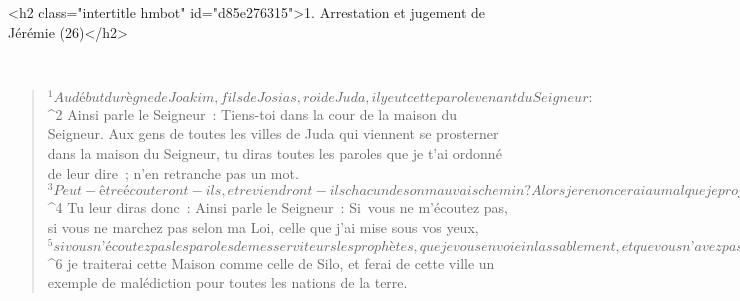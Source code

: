   
  
      <h2 class="intertitle hmbot" id="d85e276315">1. Arrestation et jugement de Jérémie (26)</h2>
      
         
      \bchapter{}
      \begin{verse}
${}^{1}Au début du règne de Joakim, fils de Josias, roi de Juda, il y eut cette parole venant du Seigneur : 
${}^{2} Ainsi parle le Seigneur : Tiens-toi dans la cour de la maison du Seigneur. Aux gens de toutes les villes de Juda qui viennent se prosterner dans la maison du Seigneur, tu diras toutes les paroles que je t’ai ordonné de leur dire ; n’en retranche pas un mot. 
${}^{3} Peut-être écouteront-ils, et reviendront-ils chacun de son mauvais chemin ? Alors je renoncerai au mal que je projette de leur faire à cause de la malice de leurs actes. 
${}^{4} Tu leur diras donc : Ainsi parle le Seigneur : Si vous ne m’écoutez pas, si vous ne marchez pas selon ma Loi, celle que j’ai mise sous vos yeux, 
${}^{5} si vous n’écoutez pas les paroles de mes serviteurs les prophètes, que je vous envoie inlassablement, et que vous n’avez pas écoutés, 
${}^{6} je traiterai cette Maison comme celle de Silo, et ferai de cette ville un exemple de malédiction pour toutes les nations de la terre.
      

\end{verse}
